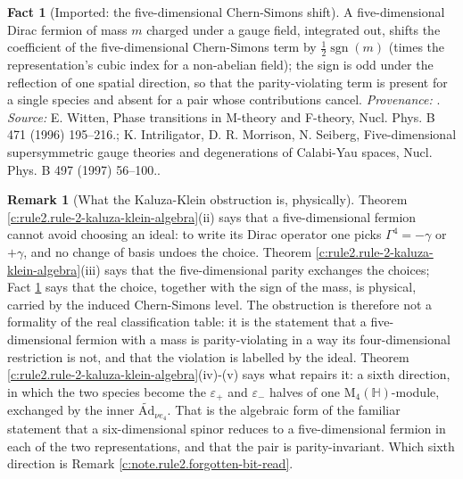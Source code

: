 \documentclass[11pt]{article}
\theoremstyle{definition}
\newtheorem{fact}[theorem]{Fact}
\newtheorem{remark}[theorem]{Remark}
\theoremstyle{plain}
\providecommand{\Ad}{}\renewcommand{\Ad}{\widetilde{\mathrm{Ad}}}
\providecommand{\HH}{}\renewcommand{\HH}{\mathbb{H}}
\providecommand{\Mat}{}\renewcommand{\Mat}{\mathrm{M}}
\providecommand{\sgn}{}\renewcommand{\sgn}{\operatorname{sgn}}
\begin{document}
\begin{fact}[Imported: the five-dimensional Chern-Simons shift]\label{c:rule2.imported-five-dimensional-chern-simons-shift}
A five-dimensional Dirac fermion of mass $m$ charged under a gauge field, integrated out, shifts the coefficient of the five-dimensional Chern-Simons term by $\tfrac12\sgn(m)$ (times the representation's cubic index for a non-abelian field); the sign is odd under the reflection of one spatial direction, so that the parity-violating term is present for a single species and absent for a pair whose contributions cancel. \emph{Provenance:} \cite{Witten1996, IMS1997}.
\emph{Source:} E. Witten, Phase transitions in M-theory and F-theory, Nucl. Phys. B 471 (1996) 195--216.; K. Intriligator, D. R. Morrison, N. Seiberg, Five-dimensional supersymmetric gauge theories and degenerations of Calabi-Yau spaces, Nucl. Phys. B 497 (1997) 56--100..
\end{fact}

\begin{remark}[What the Kaluza-Klein obstruction is, physically]\label{c:note.rule2.what-kaluza-klein-obstruction-physically}
Theorem \ref{c:rule2.rule-2-kaluza-klein-algebra}(ii) says that a five-dimensional fermion cannot avoid choosing an ideal: to write its Dirac operator one picks $\Gamma^4 = -\gamma$ or $+\gamma$, and no change of basis undoes the choice. Theorem \ref{c:rule2.rule-2-kaluza-klein-algebra}(iii) says that the five-dimensional parity exchanges the choices; Fact \ref{c:rule2.imported-five-dimensional-chern-simons-shift} says that the choice, together with the sign of the mass, is physical, carried by the induced Chern-Simons level. The obstruction is therefore not a formality of the real classification table: it is the statement that a five-dimensional fermion with a mass is parity-violating in a way its four-dimensional restriction is not, and that the violation is labelled by the ideal. Theorem \ref{c:rule2.rule-2-kaluza-klein-algebra}(iv)-(v) says what repairs it: a sixth direction, in which the two species become the $\varepsilon_+$ and $\varepsilon_-$ halves of one $\Mat_4(\HH)$-module, exchanged by the inner $\Ad_{\nu e_4}$. That is the algebraic form of the familiar statement that a six-dimensional spinor reduces to a five-dimensional fermion in each of the two representations, and that the pair is parity-invariant. Which sixth direction is Remark \ref{c:note.rule2.forgotten-bit-read}.
\end{remark}
\end{document}
